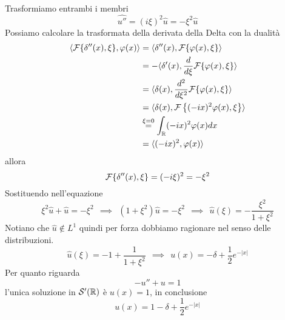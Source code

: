 Trasformiamo entrambi i membri
\begin{equation*}
\widehat{u''} =( i\xi )^{2}\hat{u} =-\xi ^{2}\hat{u}
\end{equation*}
Possiamo calcolare la trasformata della derivata della Delta con la dualità
\begin{align*}
\langle \mathcal{F} \{\delta ''( x) ,\xi \} ,\varphi ( x) \rangle  & =\langle \delta ''( x) ,\mathcal{F} \{\varphi ( x) ,\xi \} \rangle \\
 & =-\langle \delta '( x) ,\frac{d}{d\xi }\mathcal{F} \{\varphi ( x) ,\xi \} \rangle \\
 & =\langle \delta ( x) ,\frac{d^{2}}{d\xi ^{2}}\mathcal{F} \{\varphi ( x) ,\xi \} \rangle \\
 & =\langle \delta ( x) ,\mathcal{F} \left\{( -ix)^{2} \varphi ( x) ,\xi \right\} \rangle \\
 & \overset{\xi =0}{=}\int _{\mathbb{R} }( -ix)^{2} \varphi ( x) dx\\
 & =\langle ( -ix)^{2} ,\varphi ( x) \rangle 
\end{align*}
allora
\begin{equation*}
\mathcal{F} \{\delta ''( x) ,\xi \} =( -i\xi )^{2} =-\xi ^{2}
\end{equation*}
Sostituendo nell'equazione
\begin{equation*}
\xi ^{2}\hat{u} +\hat{u} =-\xi ^{2} \ \ \implies \ \ \left( 1+\xi ^{2}\right)\hat{u} =-\xi ^{2} \ \ \implies \ \ \hat{u}( \xi ) =-\frac{\xi ^{2}}{1+\xi ^{2}}
\end{equation*}
Notiano che $\hat{u} \notin L^{1}$ quindi per forza dobbiamo ragionare nel senso delle distribuzioni.
\begin{equation*}
\hat{u}( \xi ) =-1+\frac{1}{1+\xi ^{2}} \ \ \implies \ \ u( x) =-\delta +\frac{1}{2} e^{-| x| }
\end{equation*}
Per quanto riguarda
\begin{equation*}
-u''+u=1
\end{equation*}
l'unica soluzione in $\mathcal{S}  '(\mathbb{R} )$ è $u( x) =1$, in conclusione
\begin{equation*}
u( x) =1-\delta +\frac{1}{2} e^{-| x| }
\end{equation*}
\Soluzione

